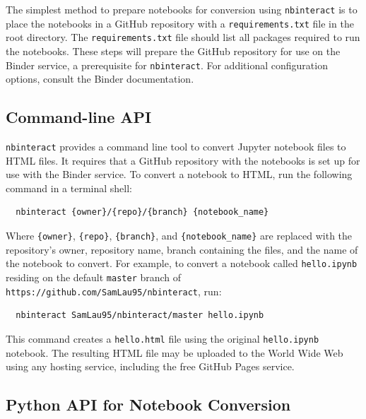 \documentclass[nobib]{tufte-handout}
\newcommand{\code}[1]{\texttt{#1}}
\begin{document}
The simplest method to prepare notebooks for conversion using \code{nbinteract}
is to place the notebooks in a GitHub repository with a \code{requirements.txt}
file in the root directory. The \code{requirements.txt} file should list all
packages required to run the notebooks. These steps will prepare the GitHub
repository for use on the Binder service, a prerequisite for \code{nbinteract}.
For additional configuration options, consult the Binder
documentation.


\subsection{Command-line API} %
\label{sub:command_line_api}

\code{nbinteract} provides a command line tool to convert Jupyter notebook
files to HTML files. It requires that a GitHub repository with the notebooks is
set up for use with the Binder service. To convert a notebook to HTML, run the
following command in a terminal shell:

\begin{verbatim}
  nbinteract {owner}/{repo}/{branch} {notebook_name}
\end{verbatim}

Where \code{\{owner\}}, \code{\{repo\}}, \code{\{branch\}}, and
\verb|{notebook_name}| are replaced with the repository's owner, repository
name, branch containing the files, and the name of the notebook to convert. For
example, to convert a notebook called \code{hello.ipynb} residing on the
default \code{master} branch of \code{https://github.com/SamLau95/nbinteract},
run:

\begin{verbatim}
  nbinteract SamLau95/nbinteract/master hello.ipynb
\end{verbatim}

This command creates a \code{hello.html} file using the original
\code{hello.ipynb} notebook. The resulting HTML file may be
uploaded to the World Wide Web using any hosting service, including the free
GitHub Pages service.


\subsection{Python API for Notebook Conversion} %
\label{sub:python_api}
\end{document}
